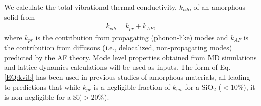 \documentclass[aps,prb,twocolumn,superscriptaddress,footinbib,amsmath,amssymb,floatfix]{revtex4}
\begin{document}
We calculate the total vibrational thermal conductivity, $k_{vib}$, 
of an amorphous solid from 
\begin{equation}\label{EQ:kvib}
\begin{split}
k_{vib} = k_{pr} + k_{AF},
\end{split}
\end{equation}
where $k_{pr}$ is the contribution from 
propagating (phonon-like) modes\cite{ashcroft_solid_1976,
dove_introduction_1993,ziman_electrons_2001} 
and $k_{AF}$ is the contribution 
from diffusons (i.e., delocalized, non-propagating modes) predicted 
by the AF theory.\cite{feldman_thermal_1993} Mode level 
properties obtained from MD simulations and lattice dynamics 
calculations will be used as inputs. 
The form of Eq. \eqref{EQ:kvib} has been used in 
previous studies of amorphous materials,
\cite{graebner_phonon_1986,freeman_thermal_1986,
love_estimate_1990,feldman_thermal_1993,cahill_thermal_1994,
feldman_numerical_1999,baldi_thermal_2008,
liu_high_2009,yang_anomalously_2010} 
all leading to predictions that while $k_{pr}$ is a negligible 
fraction of $k_{vib}$ for a-SiO$_2$ ($< 10\%$),
\cite{love_estimate_1990,baldi_thermal_2008} 
it is non-negligible 
for a-Si($> 20\%$).
\cite{feldman_thermal_1993,cahill_thermal_1994,
feldman_numerical_1999,liu_high_2009,yang_anomalously_2010,
he_heat_2011}
\end{document}

